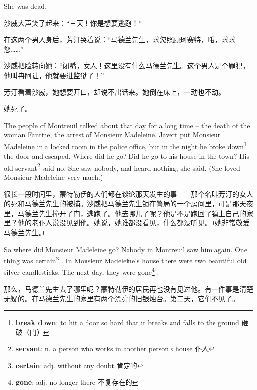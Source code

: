 \documentclass[fontset=ubuntu, zihao=5]{ctexart}
\begin{document}
\begin{paracol}{2}
  She was dead.


  \switchcolumn

  沙威大声笑了起来：“三天！你是想要逃跑！”

  在这两个男人身后，芳汀哭着说：“马德兰先生，求您照顾珂赛特，哦，求求您……”


  沙威把脸转向她：“闭嘴，女人！这里没有什么马德兰先生。这个男人是个罪犯，他叫冉阿让，他就要进监狱了！”


  芳汀看着沙威，她想要开口，却说不出话来。她倒在床上，一动也不动。


  她死了。

  \switchcolumn*

  The people of Montreuil talked about that day for a long time – the death of the woman Fantine, the arrest of Monsieur Madeleine. Javert put Monsieur Madeleine in a locked room in the police office, but in the night he broke down\footnote{\textbf{break down}: to hit a door so hard that it breaks and falls to the ground 砸破（门）}
  the door and escaped. Where did he go? Did he go to his house in the town? His old servant\footnote{\textbf{servant}: n. a person who works in another person's house 仆人}
  said no. She saw nobody, and heard nothing, she said. (She loved Monsieur Madeleine very much.)

  \switchcolumn

  很长一段时间里，蒙特勒伊的人们都在谈论那天发生的事——那个名叫芳汀的女人的死和马德兰先生的被捕。沙威把马德兰先生锁在警局的一个房间里，可是那天夜里，马德兰先生撞开了门，逃跑了。他去哪儿了呢？他是不是跑回了镇上自己的家里？他的老仆人说没见到他。她说，她谁都没看见，什么都没听见。（她非常敬爱马德兰先生。）

  \switchcolumn*

  So where did Monsieur Madeleine go? Nobody in Montreuil saw him again. One thing was certain\footnote{\textbf{certain}: adj. without any doubt 肯定的}
  . In Monsieur Madeleine's house there were two beautiful old silver candlesticks. The next day, they were gone\footnote{\textbf{gone}:  adj. no longer there 不复存在的}
  .

  \switchcolumn

  那么，马德兰先生去了哪里呢？蒙特勒伊的居民再也没有见过他。有一件事是清楚无疑的。在马德兰先生的家里有两个漂亮的旧银烛台。第二天，它们不见了。

\end{paracol}




\end{document}
